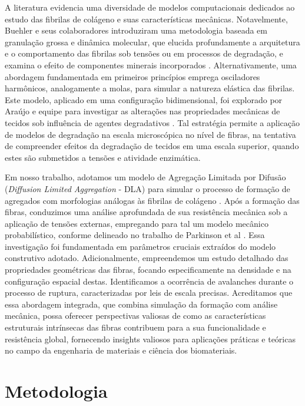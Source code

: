 \documentclass{article}
\begin{document}
    A literatura evidencia uma diversidade de modelos computacionais dedicados ao estudo das fibrilas de colágeno e suas características 
    mecânicas. Notavelmente, Buehler e seus colaboradores \cite{B1,B2,B3} introduziram uma metodologia baseada em granulação grossa e dinâmica molecular, 
    que elucida profundamente a arquitetura e o comportamento das fibrilas sob tensões ou em processos de degradação, e examina o efeito 
    de componentes minerais incorporados \cite{B4,Malaspina2017-qp,10.1002/jbmr.2705}. Alternativamente, uma abordagem fundamentada 
    em primeiros princípios emprega osciladores harmônicos, analogamente a molas, para simular a natureza elástica das fibrilas. Este modelo, 
    aplicado em uma configuração bidimensional, foi explorado por Araújo e equipe para investigar as alterações nas propriedades mecânicas 
    de tecidos sob influência de agentes degradativos \cite{Araujo}. Tal estratégia permite a aplicação de modelos de degradação na  escala 
    microscópica no nível de fibras, na tentativa de compreender efeitos da degradação de tecidos em uma escala superior, quando estes são 
    submetidos a tensões e atividade enzimática.

    Em nosso trabalho, adotamos um modelo de Agregação Limitada por Difusão (\textit{Diffusion Limited Aggregation} - DLA) para simular 
    o processo de formação de agregados com morfologias análogas às fibrilas de colágeno \cite{Parkinson1995}. Após a formação das fibras, 
    conduzimos uma análise aprofundada de sua resistência mecânica sob a aplicação de tensões externas, empregando para tal um modelo mecânico 
    probabilístico, conforme delineado no trabalho de Parkinson et al \cite{Parkinson1997}. Essa investigação foi fundamentada em parâmetros 
    cruciais extraídos do modelo construtivo adotado. Adicionalmente, empreendemos um estudo detalhado das propriedades geométricas das fibras, 
    focando especificamente na densidade e na configuração espacial destas. Identificamos a ocorrência de avalanches durante o processo de ruptura, 
    caracterizadas por leis de escala precisas. Acreditamos que essa abordagem integrada, que combina simulação da formação com análise mecânica, possa 
    oferecer perspectivas valiosas de como as características estruturais intrínsecas das fibras contribuem para a sua funcionalidade e resistência 
    global, fornecendo insights valiosos para aplicações práticas e teóricas no campo da engenharia de materiais e ciência dos biomateriais.

\section{Metodologia}
\end{document}
